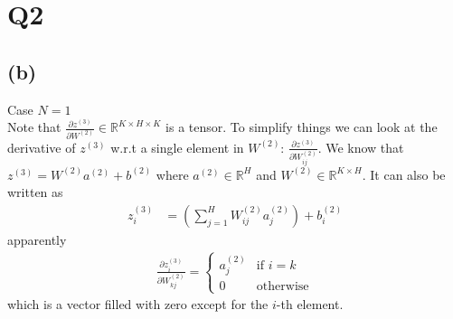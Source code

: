 \documentclass{article}
\newcommand{\bb}{b^{(2)}}
\newcommand{\ab}{a^{(2)}}
\newcommand{\zc}{z^{(3)}}
\newcommand{\Wb}{W^{(2)}}
\begin{document}
\section*{Q2}
\subsection*{(b)}
Case $N = 1$\\
Note that $\frac{\partial \zc}{\partial \Wb} \in \mathbb{R}^{K\times H\times K}$ is a tensor.
To simplify things we can look at the derivative of $\zc$ w.r.t a single element in $\Wb$: 
$\frac{\partial \zc}{\partial \Wb_{ij}}$.
We know that $\zc = \Wb\ab + \bb$ where $\ab \in \mathbb{R}^{H}$ and $\Wb \in \mathbb{R}^{K\times H}$.
It can also be written as
\begin{align*}
    \zc_i &= \left(\sum_{j=1}^{H} \Wb_{ij} \ab_j\right) + \bb_i
\end{align*}
apparently
\begin{align*}
    \frac{\partial \zc_i}{\partial \Wb_{kj}} =
    \begin{cases}
        \ab_j & \text{if } i = k\\
        0 & \text{otherwise}
    \end{cases}
\end{align*}
which is a vector filled with zero except for the $i$-th element.
\end{document}
